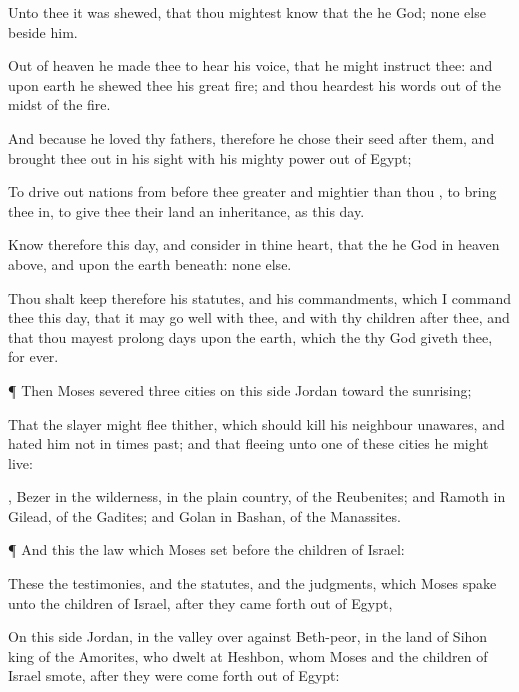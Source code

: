 {Unto thee it was
shewed, that thou mightest
know that the
{} he
{}
God;
{} none
else beside
him.

Out of
heaven he made thee to
hear his
voice, that he might
instruct thee: and upon
earth he
shewed thee his
great
fire; and thou
heardest his
words out of the
midst of the
fire.

And because he
loved thy
fathers, therefore he
chose their
seed
after them, and brought thee
out in his
sight with his
mighty
power out of
Egypt;

To drive
out
nations from
before thee
greater and
mightier than thou
{}, to
bring thee in, to
give thee their
land
{} an
inheritance, as
{} this
day.

Know therefore this
day, and
consider
{} in thine
heart, that the
{} he
{}
God in
heaven
above, and upon the
earth beneath:
{} none else.

Thou shalt
keep therefore his
statutes, and his
commandments, which I
command thee this
day, that it may go
well with thee, and with thy
children
after thee, and that thou mayest
prolong
{}
days upon the
earth, which the
{} thy
God
giveth thee, for ever.


\par }{\PP {}¶ Then
Moses
severed
three
cities on this
side
Jordan toward the
sunrising;

That the
slayer might
flee thither, which should
kill his
neighbour
unawares, and
hated him not in
times
past; and that
fleeing unto
one of
these
cities he might
live:

,
Bezer in the
wilderness, in the
plain
country, of the
Reubenites; and
Ramoth in
Gilead, of the
Gadites; and
Golan in
Bashan, of the
Manassites.


\par }{\PP {}¶ And this
{} the
law which
Moses
set
before the
children of
Israel:

These
{} the
testimonies, and the
statutes, and the
judgments, which
Moses
spake unto the
children of
Israel, after they came
forth out of
Egypt,

On this
side
Jordan, in the
valley over
against
Beth-peor, in the
land of
Sihon
king of the
Amorites, who
dwelt at
Heshbon, whom
Moses and the
children of
Israel
smote, after they were come
forth out of
Egypt:

}
